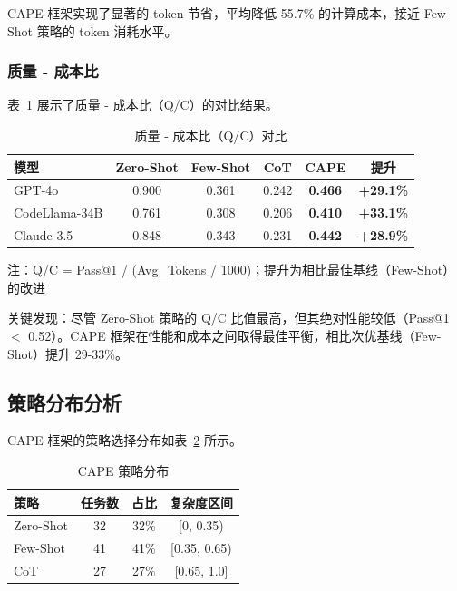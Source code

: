 \documentclass[11pt,a4paper]{article}
\begin{document}
CAPE 框架实现了显著的 token 节省，平均降低 55.7\% 的计算成本，接近 Few-Shot 策略的 token 消耗水平。

\subsubsection{质量 - 成本比}

表~\ref{tab:qc} 展示了质量 - 成本比（Q/C）的对比结果。

\begin{table}[h]
\centering
\caption{质量 - 成本比（Q/C）对比}
\label{tab:qc}
\begin{tabular}{lccccc}
\toprule
\textbf{模型} & \textbf{Zero-Shot} & \textbf{Few-Shot} & \textbf{CoT} & \textbf{CAPE} & \textbf{提升} \\
\midrule
GPT-4o & 0.900 & 0.361 & 0.242 & \textbf{0.466} & \textbf{+29.1\%} \\
CodeLlama-34B & 0.761 & 0.308 & 0.206 & \textbf{0.410} & \textbf{+33.1\%} \\
Claude-3.5 & 0.848 & 0.343 & 0.231 & \textbf{0.442} & \textbf{+28.9\%} \\
\bottomrule
\end{tabular}
\begin{flushleft}
\small 注：Q/C = Pass@1 / (Avg\_Tokens / 1000)；提升为相比最佳基线（Few-Shot）的改进
\end{flushleft}
\end{table}

关键发现：尽管 Zero-Shot 策略的 Q/C 比值最高，但其绝对性能较低（Pass@1 $<$ 0.52）。CAPE 框架在性能和成本之间取得最佳平衡，相比次优基线（Few-Shot）提升 29-33\%。

\subsection{策略分布分析}

CAPE 框架的策略选择分布如表~\ref{tab:strategy} 所示。

\begin{table}[h]
\centering
\caption{CAPE 策略分布}
\label{tab:strategy}
\begin{tabular}{lccc}
\toprule
\textbf{策略} & \textbf{任务数} & \textbf{占比} & \textbf{复杂度区间} \\
\midrule
Zero-Shot & 32 & 32\% & [0, 0.35) \\
Few-Shot & 41 & 41\% & [0.35, 0.65) \\
CoT & 27 & 27\% & [0.65, 1.0] \\
\bottomrule
\end{tabular}
\end{table}
\end{document}
